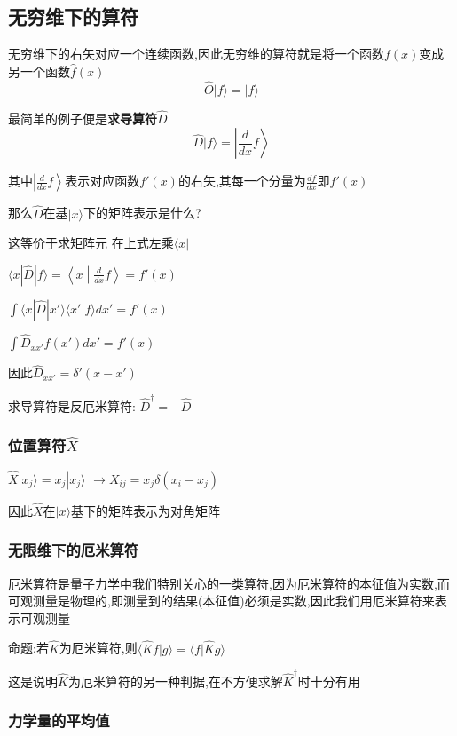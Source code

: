 \documentclass[lang=cn,10pt]{elegantbook}
\begin{document}
 \subsection{无穷维下的算符}
 无穷维下的右矢对应一个连续函数,因此无穷维的算符就是将一个函数$f(x)$变成另一个函数$\hat{f}(x)$
 \begin{equation*}
 	\hat{O}|f\rangle=|\hat{f}\rangle
 \end{equation*}
 
 最简单的例子便是\textbf{求导算符}$\hat{D}$
 \begin{equation*}
 		\hat{D}|f\rangle=\left|\frac{d}{dx}f\right\rangle
 \end{equation*}
 
 其中$\left|\frac{d}{dx}f\right\rangle$表示对应函数$f'(x)$的右矢,其每一个分量为$\frac{df}{dx}$即$f'(x)$
 
 那么$\hat{D}$在基$|x\rangle$下的矩阵表示是什么?
 
 这等价于求矩阵元
 在上式左乘$\langle x|$
 
 $\langle x|\hat{D}|f\rangle=\left\langle x\middle|\frac{d}{dx}f\right\rangle=f'(x)$
 
 $\int{\langle x|\hat{D}|x'\rangle \langle x'|f\rangle dx' =f'(x)}$
 
 $\int{\hat{D}_{xx'}f\left( x' \right) dx'=f'(x)}$
 
 因此$\hat{D}_{xx'}=\delta'(x-x')$
 
 求导算符是反厄米算符: $\hat{D}^\dagger=-\hat{D}$
	 
 \subsubsection{位置算符\texorpdfstring{$\hat{X}$}{X}}
 $\hat{X}|x_j\rangle=x_j|x_j\rangle$
 $\rightarrow X_{ij}=x_j\delta(x_i-x_j)$
 
 因此$\hat{X}$在$|x\rangle$基下的矩阵表示为对角矩阵
 \subsubsection{无限维下的厄米算符}
 厄米算符是量子力学中我们特别关心的一类算符,因为厄米算符的本征值为实数,而可观测量是物理的,即测量到的结果(本征值)必须是实数,因此我们用厄米算符来表示可观测量
	 
 命题:若$\hat{K}$为厄米算符,则$\langle \hat{K}f|g\rangle =\langle f|\hat{K}g\rangle  $
	 
 这是说明$\hat{K}$为厄米算符的另一种判据,在不方便求解$\hat{K}^{\dagger}$时十分有用
 \subsubsection{力学量的平均值}
 
\end{document}
